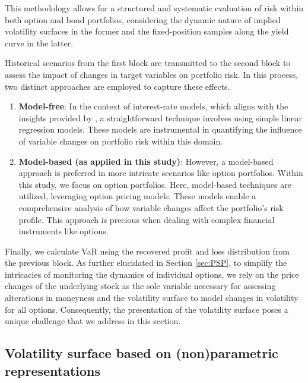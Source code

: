 This methodology allows for a structured and systematic evaluation of risk within both option and bond portfolios, considering the dynamic nature of implied volatility surfaces in the former and the fixed-position samples along the yield curve in the latter.

Historical scenarios from the first block are transmitted to the second block to assess the impact of changes in target variables on portfolio risk. In this process, two distinct approaches are employed to capture these effects.
\begin{enumerate}
    \item \textbf{Model-free}: In the context of interest-rate models, which aligns with the insights provided by \cite{zamani2022pathwise}, a straightforward technique involves using simple linear regression models. These models are instrumental in quantifying the influence of variable changes on portfolio risk within this domain.
    \item \textbf{Model-based (as applied in this study)}: However, a model-based approach is preferred in more intricate scenarios like option portfolios. Within this study, we focus on option portfolios. Here, model-based techniques are utilized, leveraging option pricing models. These models enable a comprehensive analysis of how variable changes affect the portfolio's risk profile. This approach is precious when dealing with complex financial instruments like options.
\end{enumerate}

Finally, we calculate VaR using the recovered profit and loss distribution from the previous block. As further elucidated in Section \ref{sec:PSP}, to simplify the intricacies of monitoring the dynamics of individual options, we rely on the price changes of the underlying stock as the sole variable necessary for assessing alterations in moneyness and the volatility surface to model changes in volatility for all options. Consequently, the presentation of the volatility surface poses a unique challenge that we address in this section.

\subsection{Volatility surface based on (non)parametric representations}

